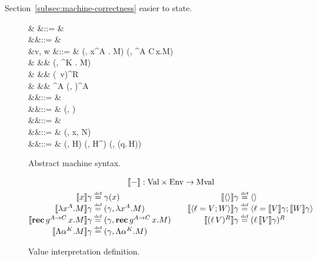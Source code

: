 \documentclass[12pt,phd,lfcs,twoside,openright,logo,leftchapter,normalheadings]{infthesis}
\theoremstyle{plain}
\theoremstyle{definition}
\begin{document}
Section~\ref{subsec:machine-correctness} easier to state.
%
%
\begin{figure}[t]
\flushleft
\begin{syntax}
           & \conf \in \MConfCat &::= &  \\
       &\env \in \MEnvCat  &::= & \emptyset \mid \env[x \mapsto v] \\
                   &v, w \in \MValCat  &::= & (\env, \lambda x^A . M) \mid (\env, \Rec^{A \to C}\,x.M)\\
                                &       &\mid& (\env, \Lambda \alpha^K . M) \\
                                &       &\mid& \Record{} \mid {} \mid (\ell\, v)^R \\
                                &       &\mid& \shk^A \mid (\shk, \slk)^A \medskip\\
            &\shk \in \MGContCat &::= & \nil \mid \shf \cons \shk \\
      &\shf \in \MGFrameCat  &::= & (\slk, \chi) \\
       &\slk \in \MPContCat  &::= & \nil \mid \slf \cons \slk \\
 &\slf \in \MPFrameCat &::= & (\env, x, N) \\
         &\chi \in \MHCloCat  &::= & (\env, H) \mid (\env, H^\dagger) \mid (\env, (q.\,H)) \medskip \\
\end{syntax}

\caption{Abstract machine syntax.}
\label{fig:abstract-machine-syntax}
\end{figure}
%
\begin{figure}
\[
\bl
\multicolumn{1}{c}{\val{-} : \ValCat \times \MEnvCat \to \MValCat}\\[1ex]
\ba[t]{@{}r@{~}c@{~}l@{}}
\val{x}{\env}                    &\defas& \env(x) \\
\val{\lambda x^A.M}{\env}        &\defas& (\env, \lambda x^A.M) \\
\val{\Rec\,g^{A \to C}\,x.M}{\env} &\defas& (\env, \Rec\,g^{A \to C}\,x.M) \\
\val{\Lambda \alpha^K.M}{\env}   &\defas& (\env, \Lambda \alpha^K.M) \\
\ea
\qquad
\ba[t]{@{}r@{~}c@{~}l@{}}
\val{\Record{}}{\env}            &\defas& \Record{} \\
\val{\Record{\ell = V; W}}{\env} &\defas& \Record{\ell = \val{V}{\env}; \val{W}{\env}} \\
\val{(\ell\, V)^R}{\env}         &\defas& (\ell\, \val{V}{\env})^R \\
\ea
\el
\]
  \caption{Value interpretation definition.}
  \label{fig:abstract-machine-val-interp}
\end{figure}
%
\end{document}
